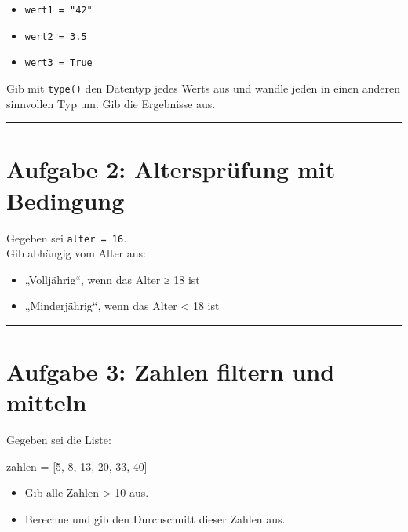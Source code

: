 \documentclass[
  letterpaper,
  DIV=11,
  numbers=noendperiod]{scrreprt}
\newenvironment{Shaded}{\begin{snugshade}}{\end{snugshade}}
\newcommand{\DecValTok}[1]{\textcolor[rgb]{0.68,0.00,0.00}{#1}}
\newcommand{\NormalTok}[1]{\textcolor[rgb]{0.00,0.23,0.31}{#1}}
\newcommand{\OperatorTok}[1]{\textcolor[rgb]{0.37,0.37,0.37}{#1}}
\providecommand{\tightlist}{%
  \setlength{\itemsep}{0pt}\setlength{\parskip}{0pt}}\usepackage{longtable,booktabs,array}
\begin{document}
\begin{itemize}
\tightlist
\item
  \texttt{wert1\ =\ "42"}
\item
  \texttt{wert2\ =\ 3.5}
\item
  \texttt{wert3\ =\ True}
\end{itemize}

Gib mit \texttt{type()} den Datentyp jedes Werts aus und wandle jeden in
einen anderen sinnvollen Typ um. Gib die Ergebnisse aus.

\begin{center}\rule{0.5\linewidth}{0.5pt}\end{center}

\section{Aufgabe 2: Altersprüfung mit
Bedingung}\label{aufgabe-2-alterspruxfcfung-mit-bedingung}

Gegeben sei \texttt{alter\ =\ 16}.\\
Gib abhängig vom Alter aus:

\begin{itemize}
\tightlist
\item
  „Volljährig``, wenn das Alter ≥ 18 ist
\item
  „Minderjährig``, wenn das Alter \textless{} 18 ist
\end{itemize}

\begin{center}\rule{0.5\linewidth}{0.5pt}\end{center}

\section{Aufgabe 3: Zahlen filtern und
mitteln}\label{aufgabe-3-zahlen-filtern-und-mitteln}

Gegeben sei die Liste:

\begin{Shaded}
\begin{Highlighting}[]
\NormalTok{zahlen }\OperatorTok{=}\NormalTok{ [}\DecValTok{5}\NormalTok{, }\DecValTok{8}\NormalTok{, }\DecValTok{13}\NormalTok{, }\DecValTok{20}\NormalTok{, }\DecValTok{33}\NormalTok{, }\DecValTok{40}\NormalTok{]}
\end{Highlighting}
\end{Shaded}

\begin{itemize}
\tightlist
\item
  Gib alle Zahlen \textgreater{} 10 aus.
\item
  Berechne und gib den Durchschnitt dieser Zahlen aus.
\end{itemize}
\end{document}
